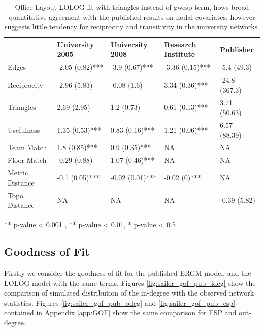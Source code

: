 \documentclass[
]{statsoc}
\begin{document}
\begin{table}

\caption{\label{tab:unnamed-chunk-5}\label{tab:sailer_lolog_tri} Office Layout LOLOG fit with triangles instead of gwesp term, hows broad quantitative agreement with the published results on nodal covariates, however suggests little tendency for reciprocity and transitivity in the university networks.}
\centering
\begin{threeparttable}
\begin{tabular}[t]{lllll}
\toprule
  & University 2005 & University 2008 & Research Institute & Publisher\\
\midrule
\rowcolor{gray!6}  Edges & -2.05 (0.82)*** & -3.9 (0.67)*** & -3.36 (0.15)*** & -5.4 (49.3)\\
Reciprocity & -2.96 (5.83) & -0.08 (1.6) & 3.34 (0.36)*** & -24.8 (367.3)\\
\rowcolor{gray!6}  Triangles & 2.69 (2.95) & 1.2 (0.73) & 0.61 (0.13)*** & 3.71 (50.63)\\
Usefulness & 1.35 (0.53)*** & 0.83 (0.16)*** & 1.21 (0.06)*** & 6.57 (88.39)\\
\rowcolor{gray!6}  Team Match & 1.8 (0.85)*** & 0.9 (0.35)*** & NA & NA\\
\addlinespace
Floor Match & -0.29 (0.88) & 1.07 (0.46)*** & NA & NA\\
\rowcolor{gray!6}  Metric Distance & -0.1 (0.05)*** & -0.02 (0.01)*** & -0.02 (0)*** & NA\\
Topo Distance & NA & NA & NA & -0.39 (5.82)\\
\bottomrule
\end{tabular}
\begin{tablenotes}
\item *** p-value < 0.001 , ** p-value < 0.01, * p-value < 0.5
\end{tablenotes}
\end{threeparttable}
\end{table}

\subsection{Goodness of Fit}

Firstly we consider the goodness of fit for the published ERGM model,
and the LOLOG model with the same terms. Figures
\ref{fig:sailer_gof_pub_ideg} show the comparison of simulated
distribution of the in-degree with the observed network statistics.
Figures \ref{fig:sailer_gof_pub_odeg} and \ref{fig:sailer_gof_pub_esp}
contained in Appendix \ref{app:GOF} show the same comparison for ESP and
out-degree.
\end{document}

